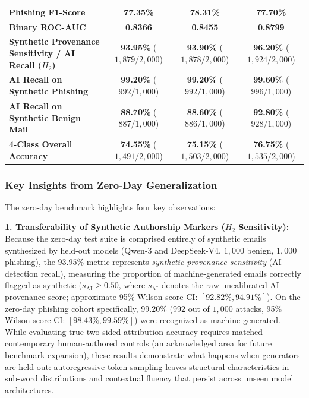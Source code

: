 \documentclass[journal]{IEEEtran}
\begin{document}
\begin{table}[!htbp]
{\begin{tabular}{l c c c}
\textbf{Phishing F1-Score} & \textbf{77.35\%} & \textbf{78.31\%} & \textbf{77.70\%} \\
\textbf{Binary ROC-AUC} & \textbf{0.8366} & \textbf{0.8455} & \textbf{0.8799} \\
\midrule
\textbf{Synthetic Provenance Sensitivity / AI Recall ($H_2$)} & \textbf{93.95\%} ($1{,}879 / 2{,}000$) & \textbf{93.90\%} ($1{,}878 / 2{,}000$) & \textbf{96.20\%} ($1{,}924 / 2{,}000$) \\
\quad \textbf{AI Recall on Synthetic Phishing} & \textbf{99.20\%} ($992 / 1{,}000$) & \textbf{99.20\%} ($992 / 1{,}000$) & \textbf{99.60\%} ($996 / 1{,}000$) \\
\quad \textbf{AI Recall on Synthetic Benign Mail} & \textbf{88.70\%} ($887 / 1{,}000$) & \textbf{88.60\%} ($886 / 1{,}000$) & \textbf{92.80\%} ($928 / 1{,}000$) \\
\midrule
\textbf{4-Class Overall Accuracy} & \textbf{74.55\%} ($1{,}491 / 2{,}000$) & \textbf{75.15\%} ($1{,}503 / 2{,}000$) & \textbf{76.75\%} ($1{,}535 / 2{,}000$) \\
\bottomrule
\end{tabular}%
}
\end{table}

\subsubsection{Key Insights from Zero-Day Generalization}
The zero-day benchmark highlights four key observations:

\textbf{1. Transferability of Synthetic Authorship Markers ($H_2$ Sensitivity):} 
Because the zero-day test suite is comprised entirely of synthetic emails synthesized by held-out models (Qwen-3 and DeepSeek-V4, $1{,}000$ benign, $1{,}000$ phishing), the $93.95\%$ metric represents \emph{synthetic provenance sensitivity} (AI detection recall), measuring the proportion of machine-generated emails correctly flagged as synthetic ($s_{\text{AI}} \ge 0.50$, where $s_{\text{AI}}$ denotes the raw uncalibrated AI provenance score; approximate 95\% Wilson score CI: $[92.82\%, 94.91\%]$). On the zero-day phishing cohort specifically, $99.20\%$ ($992$ out of $1{,}000$ attacks, 95\% Wilson score CI: $[98.43\%, 99.59\%]$) were recognized as machine-generated. While evaluating true two-sided attribution accuracy requires matched contemporary human-authored controls (an acknowledged area for future benchmark expansion), these results demonstrate what happens when generators are held out: autoregressive token sampling leaves structural characteristics in sub-word distributions and contextual fluency that persist across unseen model architectures.
\end{document}
